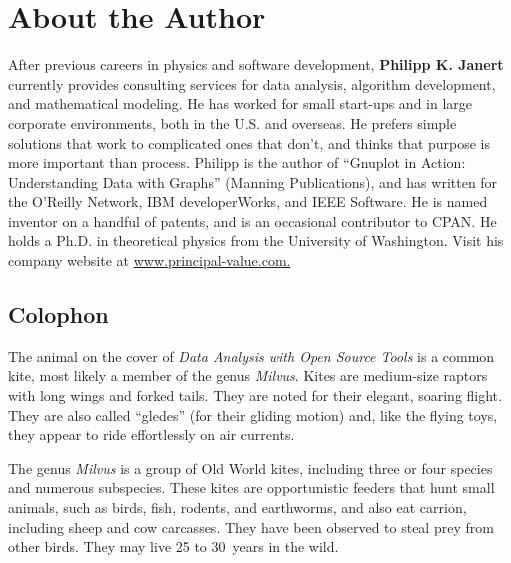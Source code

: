 \documentclass{Oreilly5980006}
\begin{document}
\chapter*{About the Author}{}{}
\thispagestyle{empty}

After previous careers in physics and software 
development, {\bf Philipp K. Janert} currently 
provides consulting services for data analysis, 
algorithm development, and mathematical modeling. 
He has worked for small start-ups and in large 
corporate environments, both in the U.S. and 
overseas. He prefers simple solutions that work 
to complicated ones that don't, and thinks that 
purpose is more important than process. Philipp 
is the author of ``Gnuplot in Action:  Understanding
Data with Graphs'' (Manning Publications), and has 
written for the O'Reilly Network, IBM developerWorks, 
and IEEE Software. He is named inventor on a handful 
of patents, and is an occasional contributor to CPAN. 
He holds a Ph.D. in theoretical physics from the 
University of Washington. Visit his company website 
at \url{www.principal-value.com.}




\section*{Colophon}
The animal on the cover of {\it Data Analysis with Open Source Tools} is a common kite, most likely a member of the genus {\it Milvus}. Kites are
medium-size raptors with long wings and forked tails. They are noted for their elegant, soaring flight. They are also called ``gledes''
(for their gliding motion) and, like the flying toys, they appear to ride effortlessly on air currents.

The genus {\it Milvus} is a group of Old World kites, including three or four species and numerous subspecies. These kites are opportunistic
feeders that hunt small animals, such as birds, fish, rodents, and earthworms, and also eat carrion, including sheep and cow carcasses.
They have been observed to steal prey from other birds. They may live 25 to 30~years in the wild.
\end{document}
